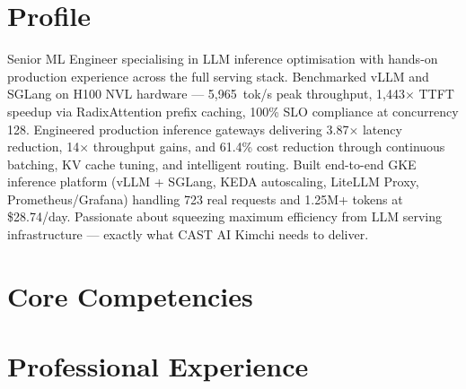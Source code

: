 \documentclass[11pt,a4paper]{moderncv}
\begin{document}
\makecvtitle

\section{Profile}
Senior ML Engineer specialising in LLM inference optimisation with hands-on production experience across the full serving stack. Benchmarked vLLM and SGLang on H100 NVL hardware — 5,965~tok/s peak throughput, 1,443$\times$ TTFT speedup via RadixAttention prefix caching, 100\% SLO compliance at concurrency 128. Engineered production inference gateways delivering 3.87$\times$ latency reduction, 14$\times$ throughput gains, and 61.4\% cost reduction through continuous batching, KV cache tuning, and intelligent routing. Built end-to-end GKE inference platform (vLLM + SGLang, KEDA autoscaling, LiteLLM Proxy, Prometheus/Grafana) handling 723 real requests and 1.25M+ tokens at \$28.74/day. Passionate about squeezing maximum efficiency from LLM serving infrastructure — exactly what CAST AI Kimchi needs to deliver.

\section{Core Competencies}

\section{Professional Experience}
\end{document}
